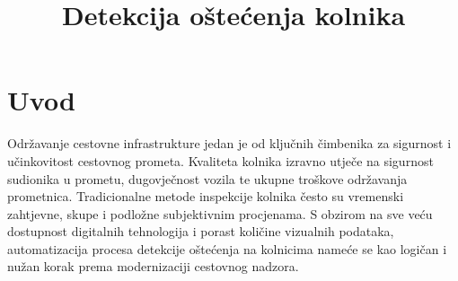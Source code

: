 \documentclass[conference]{IEEEtran}
\begin{document}
\title{Detekcija oštećenja kolnika
}

\author{
\and
{}
\and
{}
\and
{}
\and
{}
}


\maketitle







\section{Uvod}
\label{pog:uvod}

Održavanje cestovne infrastrukture jedan je od ključnih čimbenika za sigurnost i učinkovitost cestovnog prometa. Kvaliteta kolnika izravno utječe na sigurnost sudionika u prometu, dugovječnost vozila te ukupne troškove održavanja prometnica. Tradicionalne metode inspekcije kolnika često su vremenski zahtjevne, skupe i podložne subjektivnim procjenama. S obzirom na sve veću dostupnost digitalnih tehnologija i porast količine vizualnih podataka, automatizacija procesa detekcije oštećenja na kolnicima nameće se kao logičan i nužan korak prema modernizaciji cestovnog nadzora.
\end{document}
